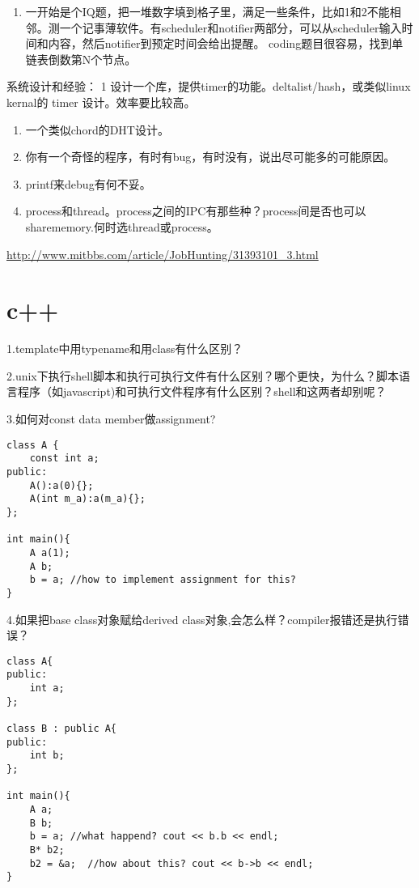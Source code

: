 \documentclass[12pt]{book}
\begin{document}
\begin{enumerate}
\item 一开始是个IQ题，把一堆数字填到格子里，满足一些条件，比如1和2不能相邻。测一个记事薄软件。有scheduler和notifier两部分，可以从scheduler输入时间和内容，然后notifier到预定时间会给出提醒。 coding题目很容易，找到单链表倒数第N个节点。
\end{enumerate}

系统设计和经验：
1 设计一个库，提供timer的功能。deltalist/hash，或类似linux kernal的 timer 设计。效率要比较高。
\begin{enumerate}
\item 一个类似chord的DHT设计。
\item 你有一个奇怪的程序，有时有bug，有时没有，说出尽可能多的可能原因。
\item printf来debug有何不妥。
\item process和thread。process之间的IPC有那些种？process间是否也可以sharememory.何时选thread或process。
\end{enumerate}
\url{http://www.mitbbs.com/article/JobHunting/31393101_3.html}

\chapter{c++}
\label{sec-18}
1.template中用typename和用class有什么区别？

2.unix下执行shell脚本和执行可执行文件有什么区别？哪个更快，为什么？脚本语言程序（如javascript)和可执行文件程序有什么区别？shell和这两者却别呢？

3.如何对const data member做assignment?
\lstset{language=java,label= ,caption= ,numbers=none}
\begin{lstlisting}
class A {
    const int a;
public:
    A():a(0){};
    A(int m_a):a(m_a){};
};

int main(){
    A a(1);
    A b;
    b = a; //how to implement assignment for this?
}
\end{lstlisting}

4.如果把base class对象赋给derived class对象,会怎么样？compiler报错还是执行错
误？
\lstset{language=java,label= ,caption= ,numbers=none}
\begin{lstlisting}
class A{
public:
    int a;
};

class B : public A{
public:
    int b;
};

int main(){
    A a;
    B b;
    b = a; //what happend? cout << b.b << endl;    
    B* b2;
    b2 = &a;  //how about this? cout << b->b << endl; 
}
\end{lstlisting}
\end{document}
